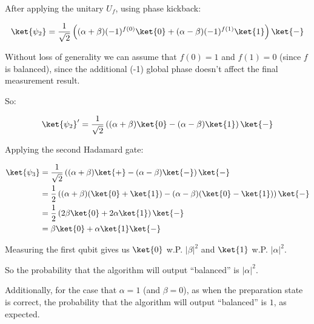 \documentclass{article}
\newcommand{\abs}[1]{\left\lvert #1 \right\rvert}
\begin{document}
\begin{enumerate}
\begin{enumerate}
                After applying the unitary $U_f$, using phase kickback:

                $$\begin{aligned}
                    \ket{\psi_2} & = \frac{1}{\sqrt{2}} \left( (\alpha+\beta)(-1)^{f(0)} \ket{0} + (\alpha-\beta)(-1)^{f(1)} \ket{1} \right) \ket{-} \\
                  \end{aligned}$$

                Without loss of generality we can assume that $f(0)=1$ and $f(1)=0$ (since $f$ is balanced), since the additional (-1) global phase doesn't affect the final measurement result.

                So:

                $$\begin{aligned}
                    \ket{\psi_2}' & = \frac{1}{\sqrt{2}} \left( (\alpha+\beta) \ket{0} - (\alpha-\beta) \ket{1} \right) \ket{-} \\
                  \end{aligned}$$

                Applying the second Hadamard gate:

                $$\begin{aligned}
                    \ket{\psi_3} & = \frac{1}{\sqrt{2}} \left( (\alpha+\beta) \ket{+} - (\alpha-\beta) \ket{-} \right) \ket{-}              \\
                                 & = \frac{1}{2} \left( (\alpha+\beta) (\ket{0}+\ket{1}) - (\alpha-\beta) (\ket{0}-\ket{1}) \right) \ket{-} \\
                                 & = \frac{1}{2} \left( 2\beta\ket{0} + 2\alpha\ket{1} \right) \ket{-}                                      \\
                                 & = \beta\ket{0} + \alpha\ket{1} \ket{-}                                                                   \\
                  \end{aligned}$$

                Measuring the first qubit gives us $\ket{0}$ w.P. $\abs{\beta}^2$ and $\ket{1}$ w.P. $\abs{\alpha}^2$.

                So the probability that the algorithm will output ``balanced'' is $\abs{\alpha}^2$.

                Additionally, for the case that $\alpha=1$ (and $\beta=0$), as when the preparation state is correct,
                the probability that the algorithm will output ``balanced'' is $1$, as expected.



\end{enumerate}
\end{enumerate}
\end{document}
